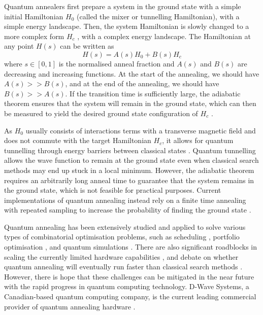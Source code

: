 Quantum annealers first prepare a system in the ground state with a simple initial Hamiltonian $H_0$ (called the mixer or tunnelling Hamiltonian), with a simple energy landscape. Then, the system Hamiltonian is slowly changed to a more complex form $H_c$ \cite{b10}, with a complex energy landscape. The Hamiltonian at any point $H(s)$ can be written as
\begin{equation}
    \label{eqn:annealinghamiltonian}
    H(s) = A(s)H_0 + B(s)H_c
\end{equation}
where $s \in [0,1]$ is the normalised anneal fraction and $A(s)$ and $B(s)$ are decreasing and increasing functions. At the start of the annealing, we should have $A(s) >> B(s)$, and at the end of the annealing, we should have $B(s) >> A(s)$. If the transition time is sufficiently large, the adiabatic theorem ensures that the system will remain in the ground state, which can then be measured to yield the desired ground state configuration of $H_c$ \cite{b14}.

As $H_0$ usually consists of interactions terms with a transverse magnetic field and does not commute with the target Hamiltonian $H_c$, it allows for quantum tunnelling through energy barriers between classical states \cite{kadowaki1998quantum}. Quantum tunnelling allows the wave function to remain at the ground state even when classical search methods may end up stuck in a local minimum. However, the adiabatic theorem requires an arbitrarily long anneal time to guarantee that the system remains in the ground state, which is not feasible for practical purposes. Current implementations of quantum annealing instead rely on a finite time annealing with repeated sampling to increase the probability of finding the ground state .

Quantum annealing has been extensively studied and applied to solve various types of combinatorial optimisation problems, such as scheduling , portfolio optimisation , and quantum simulations . There are also significant roadblocks in scaling the currently limited hardware capabilities \cite{b14}, and debate on whether quantum annealing will eventually run faster than classical search methods \cite{b10}. However, there is hope that these challenges can be mitigated in the near future with the rapid progress in quantum computing technology. D-Wave Systems, a Canadian-based quantum computing company, is the current leading commercial provider of quantum annealing hardware \cite{b16}.

